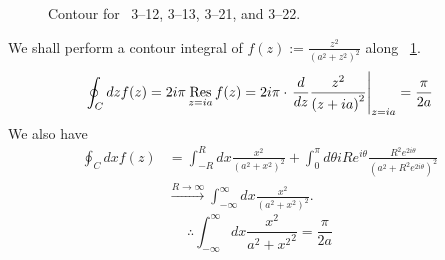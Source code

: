 \item

\begin{figure}[h]
	\centering
	\caption{Contour for ~3--12, 3--13, 3--21, and 3--22.}%
	\label{fig:problem3-12}
\end{figure}

We shall perform a contour integral of $f(z) := \frac{z^2}{{\left( a^2 + z^2 \right)}^2}$ along ~\ref{fig:problem3-12}.
\[
	\oint_C dz f(z)
	= 2i\pi \mathop{\mathrm{Res}}_{z = ia} f(z)
	= 2i\pi \cdot {\left. \frac{d}{dz} \frac{z^2}{{\left( z + ia \right)}^2} \right|}_{z = ia}
	= \frac{\pi}{2a}
\]
We also have
\begin{align*}
	\oint_C dx f(z)
	 & = \int_{-R}^{R} dx \frac{x^2}{{\left( a^2 + x^2 \right)}^2}
	+\int_0^{\pi} d\theta iRe^{i\theta} \frac{R^2 e^{2i\theta}}{{\left( a^2 + R^2 e^{2i\theta} \right)}^2}     \\
	 & \xrightarrow{R \rightarrow \infty} \int_{-\infty}^{\infty} dx \frac{x^2}{{\left( a^2 + x^2 \right)}^2}.
\end{align*}
\[
	\therefore \int_{-\infty}^{\infty} dx \frac{x^2}{{a^2 + x^2}^2} = \frac{\pi}{2a}
\]